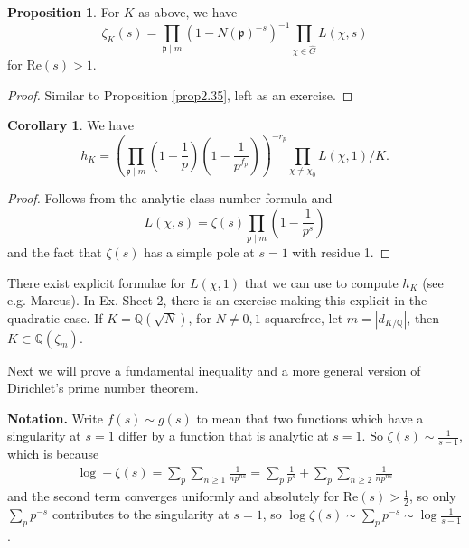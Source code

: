 \documentclass{article}
\theoremstyle{definition}
\newtheorem{cor}[theorem]{Corollary}
\newtheorem{prop}[theorem]{Proposition}
\begin{document}
\begin{prop}\label{prop2.38}
    For $K$ as above, we have
    \[
    \zeta_K(s) = \prod_{\mathfrak{p} \mid m}^{} (1-N(\mathfrak{p})^{-s})^{-1} \prod_{\chi \in \widehat{G}}^{} L(\chi,s)
    \]
    for $\text{Re}(s)>1$.
\end{prop}
\begin{proof}
    Similar to Proposition \ref{prop2.35}, left as an exercise.
\end{proof}
\begin{cor}\label{cor2.39}
    We have \[
    h_K = \left(\prod_{\mathfrak{p}\mid m}^{} \left(1-\frac{1}{p}\right)\left(1-\frac{1}{p^{f_p}}\right) \right)^{-r_p} \prod_{\chi \neq \chi_0}^{} L(\chi,1)/K.
    \]
\end{cor}
\begin{proof}
    Follows from the analytic class number formula and $$L(\chi,s) = \zeta(s) \prod_{ p \mid m}^{} \left(1-\frac{1}{p^s}\right)$$ and the fact that $\zeta(s)$ has a simple pole at $s=1$ with residue 1.
\end{proof}
There exist explicit formulae for $L(\chi,1)$ that we can use to compute $h_K$ (see e.g. Marcus). In Ex. Sheet 2, there is an exercise making this explicit in the quadratic case. If $K = \mathbb{Q}(\sqrt{N})$, for $N \neq 0,1$ squarefree, let $m = \left|d_{K/\mathbb{Q}}\right|$, then $K \subset \mathbb{Q}(\zeta_m)$.
\vspace{1mm}
 
Next we will prove a fundamental inequality and a more general version of Dirichlet's prime number theorem.
\vspace{1mm}
 
\textbf{Notation.} Write $f(s)\sim g(s)$ to mean that two functions which have a singularity at $s=1$ differ by a function that is analytic at $s=1$. So $\zeta(s) \sim\frac{1}{s-1}$, which is because 
\begin{align*}
    \log -\zeta(s) = \sum_{p}^{} \sum_{n\ge 1}^{} \frac{1}{np^{ns}} = \sum_{p}^{} \frac{1}{p^s} + \sum_{p}^{} \sum_{n\ge 2}^{} \frac{1}{np^{ns}}
\end{align*}
and the second term converges uniformly and absolutely for $\text{Re}(s)>\frac{1}{2}$, so only $\sum_{p}^{} p^{-s}$ contributes to the singularity at $s=1$, so $\log \zeta(s) \sim \sum_{p}^{} p^{-s} \sim \log \frac{1}{s-1}$.
\vspace{1mm}
 
\end{document}
